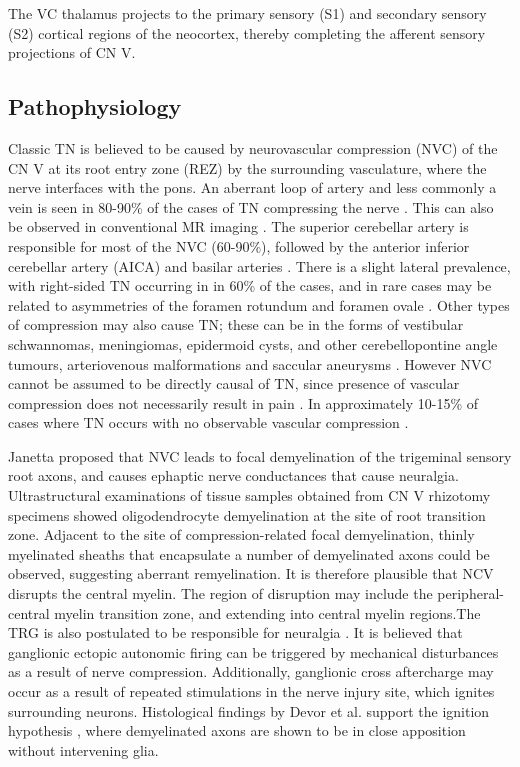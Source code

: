 The VC thalamus projects to the primary sensory (S1) and secondary sensory (S2) cortical regions of the neocortex, thereby completing the afferent sensory projections of CN V. 



\subsection{Pathophysiology}

Classic TN is believed to be caused by neurovascular compression (NVC) of the CN V at its root entry zone (REZ) by the surrounding vasculature, where the nerve interfaces with the pons. An aberrant loop of artery and less commonly a vein is seen in 80-90\% of the cases of TN compressing the nerve \cite{Love2001,McLaughlin1999}. This can also be observed in conventional MR imaging \cite{Borges2010}. The superior cerebellar artery is responsible for most of the NVC (60-90\%), followed by the anterior inferior cerebellar artery (AICA) and basilar arteries \cite{Lutz2011}. There is a slight lateral prevalence, with right-sided TN occurring in  in 60\% of the cases, and in rare cases may be related to asymmetries of the foramen rotundum and foramen ovale \cite{Toda2009}.  Other types of compression may also cause TN; these can be in the forms of vestibular schwannomas, meningiomas, epidermoid cysts, and other cerebellopontine angle tumours, arteriovenous malformations and saccular aneurysms \cite{Haller2016,Love2001}. However NVC cannot be assumed to be directly causal of TN, since presence of vascular compression does not necessarily result in pain \cite{Desouza2013,Hodaie2013}. In approximately 10-15\% of cases where TN occurs with no observable vascular compression \cite{Revuelta-Gutierrez2006,Maarbjerg2015}.


Janetta \cite{Jannetta1967} proposed that NVC leads to focal demyelination of the trigeminal sensory root axons, and causes ephaptic nerve conductances that cause neuralgia. Ultrastructural examinations \cite{Love1998} of tissue samples obtained from CN V rhizotomy specimens showed oligodendrocyte demyelination at the site of root transition zone. Adjacent to the site of compression-related focal demyelination, thinly myelinated sheaths that encapsulate a number of demyelinated axons could be observed, suggesting aberrant remyelination. It is therefore plausible that NCV disrupts the central myelin. The region of disruption may include the peripheral-central myelin transition zone, and extending into central myelin regions.The TRG is also postulated to be responsible for neuralgia \cite{Rappaport1994}. It is believed that ganglionic ectopic autonomic firing can be triggered by mechanical disturbances as a result of nerve compression. Additionally, ganglionic cross aftercharge may occur as a result of repeated stimulations in the nerve injury site, which ignites surrounding neurons. Histological findings by Devor et al. support the ignition hypothesis \cite{Devor2002a}, where demyelinated axons are shown to be in close apposition without intervening glia.  

